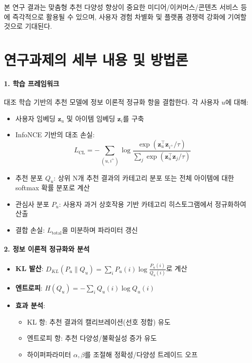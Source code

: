 \documentclass[a4paper, 12pt]{article}
\begin{document}
본 연구 결과는 맞춤형 추천 다양성 향상이 중요한 미디어/이커머스/콘텐츠 서비스 등에 즉각적으로 활용될 수 있으며, 사용자 경험 차별화 및 플랫폼 경쟁력 강화에 기여할 것으로 기대된다.

\section*{연구과제의 세부 내용 및 방법론}

\paragraph{1. 학습 프레임워크}
대조 학습 기반의 추천 모델에 정보 이론적 정규화 항을 결합한다. 각 사용자 $u$에 대해:

\begin{itemize}
    \item 사용자 임베딩 $\mathbf{z}_u$ 및 아이템 임베딩 $\mathbf{z}_i$를 구축
    \item InfoNCE 기반의 대조 손실: 
    \[
    L_{\mathrm{CL}} = -\sum_{(u,i^+)} \log \frac{\exp(\mathbf{z}_u^\top \mathbf{z}_{i^+}/\tau)}{\sum_{j} \exp(\mathbf{z}_u^\top \mathbf{z}_j/\tau)}
    \]
    \item 추천 분포 $Q_u$: 상위 N개 추천 결과의 카테고리 분포 또는 전체 아이템에 대한 softmax 확률 분포로 계산
    \item 관심사 분포 $P_u$: 사용자 과거 상호작용 기반 카테고리 히스토그램에서 정규화하여 산출
    \item 결합 손실: $L_{\mathrm{total}}$을 미분하며 파라미터 갱신
\end{itemize}

\paragraph{2. 정보 이론적 정규화와 분석}
\begin{itemize}
    \item \textbf{KL 발산}: $D_{KL}(P_u\|Q_u) = \sum_{i} P_u(i)\log\frac{P_u(i)}{Q_u(i)}$로 계산
    \item \textbf{엔트로피}: $H(Q_u) = -\sum_{i} Q_u(i)\log Q_u(i)$
    \item \textbf{효과 분석}: 
        \begin{itemize}
            \item KL 항: 추천 결과의 캘리브레이션(선호 정합) 유도
            \item 엔트로피 항: 추천 다양성/불확실성 증가 유도
            \item 하이퍼파라미터 $\alpha,\beta$를 조절해 정확성/다양성 트레이드 오프
        \end{itemize}
\end{itemize}
\end{document}
